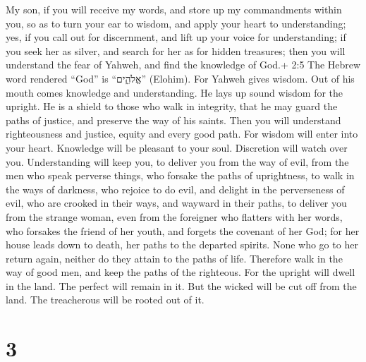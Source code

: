  My son, if you will receive my words, and store up my
commandments within you,  so as to turn your ear to wisdom,
and apply your heart to understanding;  yes, if you call out
for discernment, and lift up your voice for understanding; 
if you seek her as silver, and search for her as for hidden treasures;
 then you will understand the fear of Yahweh, and find the
knowledge of God.+ 2:5 The Hebrew word rendered ``God'' is ``אֱלֹהִ֑ים''
(Elohim).  For Yahweh gives wisdom. Out of his mouth comes
knowledge and understanding.  He lays up sound wisdom for
the upright. He is a shield to those who walk in integrity, 
that he may guard the paths of justice, and preserve the way of his
saints.  Then you will understand righteousness and justice,
equity and every good path.  For wisdom will enter into
your heart. Knowledge will be pleasant to your soul. 
Discretion will watch over you. Understanding will keep you,
 to deliver you from the way of evil, from the men who
speak perverse things,  who forsake the paths of
uprightness, to walk in the ways of darkness,  who rejoice
to do evil, and delight in the perverseness of evil,  who
are crooked in their ways, and wayward in their paths,  to
deliver you from the strange woman, even from the foreigner who flatters
with her words,  who forsakes the friend of her youth, and
forgets the covenant of her God;  for her house leads down
to death, her paths to the departed spirits.  None who go
to her return again, neither do they attain to the paths of life.
 Therefore walk in the way of good men, and keep the paths
of the righteous.  For the upright will dwell in the land.
The perfect will remain in it.  But the wicked will be cut
off from the land. The treacherous will be rooted out of it.

\hypertarget{section-2}{%
\section{3}\label{section-2}}

